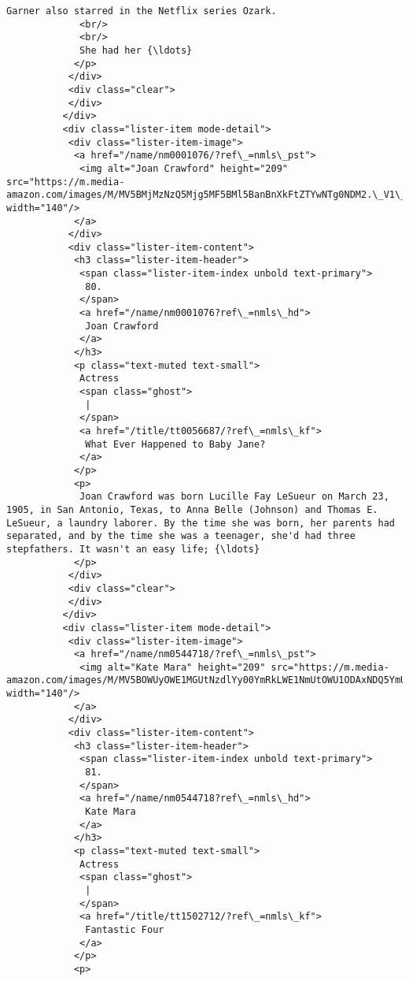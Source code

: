 \documentclass[11pt]{article}
\begin{document}
\begin{Verbatim}[commandchars=\\\{\}]
             Garner also starred in the Netflix series Ozark.
             <br/>
             <br/>
             She had her {\ldots}
            </p>
           </div>
           <div class="clear">
           </div>
          </div>
          <div class="lister-item mode-detail">
           <div class="lister-item-image">
            <a href="/name/nm0001076/?ref\_=nmls\_pst">
             <img alt="Joan Crawford" height="209" src="https://m.media-amazon.com/images/M/MV5BMjMzNzQ5Mjg5MF5BMl5BanBnXkFtZTYwNTg0NDM2.\_V1\_UY209\_CR5,0,140,209\_AL\_.jpg" width="140"/>
            </a>
           </div>
           <div class="lister-item-content">
            <h3 class="lister-item-header">
             <span class="lister-item-index unbold text-primary">
              80.
             </span>
             <a href="/name/nm0001076?ref\_=nmls\_hd">
              Joan Crawford
             </a>
            </h3>
            <p class="text-muted text-small">
             Actress
             <span class="ghost">
              |
             </span>
             <a href="/title/tt0056687/?ref\_=nmls\_kf">
              What Ever Happened to Baby Jane?
             </a>
            </p>
            <p>
             Joan Crawford was born Lucille Fay LeSueur on March 23, 1905, in San Antonio, Texas, to Anna Belle (Johnson) and Thomas E. LeSueur, a laundry laborer. By the time she was born, her parents had separated, and by the time she was a teenager, she'd had three stepfathers. It wasn't an easy life; {\ldots}
            </p>
           </div>
           <div class="clear">
           </div>
          </div>
          <div class="lister-item mode-detail">
           <div class="lister-item-image">
            <a href="/name/nm0544718/?ref\_=nmls\_pst">
             <img alt="Kate Mara" height="209" src="https://m.media-amazon.com/images/M/MV5BOWUyOWE1MGUtNzdlYy00YmRkLWE1NmUtOWU1ODAxNDQ5YmUxXkEyXkFqcGdeQXVyMjQwMDg0Ng@@.\_V1\_UY209\_CR8,0,140,209\_AL\_.jpg" width="140"/>
            </a>
           </div>
           <div class="lister-item-content">
            <h3 class="lister-item-header">
             <span class="lister-item-index unbold text-primary">
              81.
             </span>
             <a href="/name/nm0544718?ref\_=nmls\_hd">
              Kate Mara
             </a>
            </h3>
            <p class="text-muted text-small">
             Actress
             <span class="ghost">
              |
             </span>
             <a href="/title/tt1502712/?ref\_=nmls\_kf">
              Fantastic Four
             </a>
            </p>
            <p>

\end{Verbatim}
\end{document}
